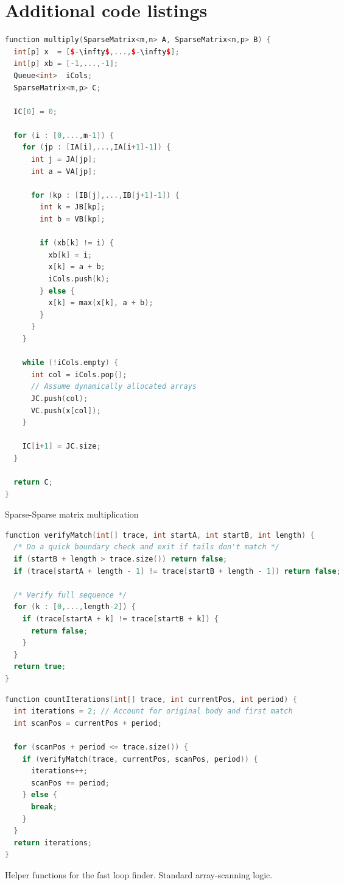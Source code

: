 \chapter{Additional code listings}

\begin{algfloat}[ht]
\begin{lstlisting}[mathescape=true,language=C++]
function multiply(SparseMatrix<m,n> A, SparseMatrix<n,p> B) {
  int[p] x  = [$-\infty$,...,$-\infty$];
  int[p] xb = [-1,...,-1];
  Queue<int>  iCols;
  SparseMatrix<m,p> C;

  IC[0] = 0;

  for (i : [0,...,m-1]) {
    for (jp : [IA[i],...,IA[i+1]-1]) {
      int j = JA[jp];
      int a = VA[jp];

      for (kp : [IB[j],...,IB[j+1]-1]) {
        int k = JB[kp];
        int b = VB[kp];

        if (xb[k] != i) {
          xb[k] = i;
          x[k] = a + b;
          iCols.push(k);
        } else {
          x[k] = max(x[k], a + b);
        }
      }
    }

    while (!iCols.empty) {
      int col = iCols.pop();
      // Assume dynamically allocated arrays
      JC.push(col);
      VC.push(x[col]);
    }

    IC[i+1] = JC.size;
  }

  return C;
}
\end{lstlisting}
\caption{Sparse-Sparse matrix multiplication}
\label{alg:Sp-Sp-matrix}
\end{algfloat}

\begin{algfloat}[htbp]
\begin{lstlisting}[language=C++, caption={Verifying trace ranges match}, label={alg:verify}]
function verifyMatch(int[] trace, int startA, int startB, int length) {
  /* Do a quick boundary check and exit if tails don't match */
  if (startB + length > trace.size()) return false;
  if (trace[startA + length - 1] != trace[startB + length - 1]) return false;

  /* Verify full sequence */
  for (k : [0,...,length-2]) {
    if (trace[startA + k] != trace[startB + k]) {
      return false;
    }
  }
  return true;
}
\end{lstlisting}

\begin{lstlisting}[language=C++, caption={Greedily finding all iterations}, label={alg:iterate}]
function countIterations(int[] trace, int currentPos, int period) {
  int iterations = 2; // Account for original body and first match
  int scanPos = currentPos + period;

  for (scanPos + period <= trace.size()) {
    if (verifyMatch(trace, currentPos, scanPos, period)) {
      iterations++;
      scanPos += period;
    } else {
      break;
    }
  }
  return iterations;
}
\end{lstlisting}
\caption{Helper functions for the fast loop finder. Standard array-scanning logic.}
\label{alg:fast-loop-helper}
\end{algfloat}

